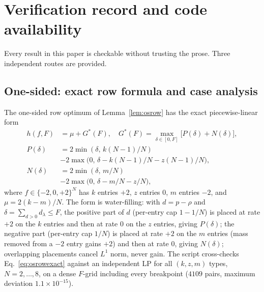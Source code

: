 \documentclass[aps,pra,reprint,superscriptaddress,floatfix]{revtex4-2}
\begin{document}
\section{Verification record and code availability}
\label{supp:verify}

Every result in this paper is checkable without trusting the prose. Three
independent routes are provided.

\subsection{One-sided: exact row formula and case analysis}
\label{supp:osdetails}

The one-sided row optimum of Lemma~\ref{lem:osrow} has the exact
piecewise-linear form
\begin{equation}
\begin{aligned}
h(f,F) &= \mu + G^*(F), \quad
G^*(F) = \max_{\delta\in[0,F]}\bigl[P(\delta)+N(\delta)\bigr],\\
P(\delta) &= 2\min(\delta,\,k(N-1)/N)\\
&-2\max\bigl(0,\,\delta-k(N-1)/N-z(N-1)/N\bigr),\\
N(\delta) &= 2\min(\delta,\,m/N)\\
&-2\max\bigl(0,\,\delta-m/N-z/N\bigr),
\end{aligned}
\label{eq:osrowexact}
\end{equation}
where $f\in\{-2,0,+2\}^N$ has $k$ entries $+2$, $z$ entries $0$, $m$
entries $-2$, and $\mu=2(k-m)/N$. The form is water-filling: with
$d=p-\rho$ and $\delta=\sum_{d>0}d_\lambda\le F$, the positive part of $d$
(per-entry cap $1-1/N$) is placed at rate $+2$ on the $k$ entries and then
at rate $0$ on the $z$ entries, giving $P(\delta)$; the negative part
(per-entry cap $1/N$) is placed at rate $+2$ on the $m$ entries (mass
removed from a $-2$ entry gains $+2$) and then at rate $0$, giving
$N(\delta)$; overlapping placements cancel $L^1$ norm, never gain. The
script cross-checks Eq.~\eqref{eq:osrowexact} against an independent LP for
all $(k,z,m)$ types, $N=2,\dots,8$, on a dense $F$-grid including every
breakpoint ($4109$ pairs, maximum deviation $1.1\times10^{-15}$).
\end{document}
